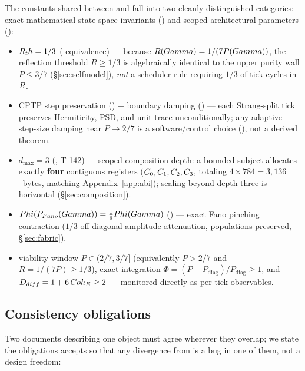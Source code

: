 The constants shared between \SYNARC{} and \TALOS{} fall into two cleanly
distinguished categories: exact mathematical state-space invariants ()
and scoped architectural parameters ():

\begin{itemize}[leftmargin=1.5em,itemsep=1pt]
  \item $R_th=1/3$ ( equivalence) --- because $R(Gamma)=1/(7P(Gamma))$,
        the reflection threshold $R\ge 1/3$ is algebraically identical to the
        upper purity wall $P\le 3/7$ (\S\ref{sec:selfmodel}), \emph{not} a
        scheduler rule requiring $1/3$ of tick cycles in $R$.
  \item CPTP step preservation () + boundary damping () ---
        each Strang-split tick preserves Hermiticity, PSD, and unit trace
        unconditionally; any adaptive step-size damping near $P\to 2/7$ is a
        software/control choice (), not a derived theorem.
  \item $d_{\max}=3$ (, T-142) --- scoped composition depth: a
        bounded subject allocates exactly \textbf{four} contiguous \DM{}
        registers ($C_0,C_1,C_2,C_3$, totaling $4\times 784 =
        3{,}136$~bytes, matching Appendix~\ref{app:abi}); scaling beyond depth
        three is horizontal (\S\ref{sec:composition}).
  \item $Phi(P_{Fano}(Gamma))=\tfrac{1}{9}Phi(Gamma)$
        () --- exact Fano pinching contraction ($1/3$ off-diagonal
        amplitude attenuation, populations preserved, \S\ref{sec:fabric}).
  \item viability window $P\in(2/7,3/7]$ (equivalently $P>2/7$ and
        $R=1/(7P)\ge 1/3$), exact integration
        $\Phi=(P-P_{\mathrm{diag}})/P_{\mathrm{diag}}\ge 1$, and
        $D_{diff}=1+6\,Coh_E\ge 2$ --- monitored directly as per-tick
        observables.
\end{itemize}

\subsection{Consistency obligations}

Two documents describing one object must agree wherever they overlap; we
state the obligations \TALOS{} accepts so that any divergence from \SYNARC{}
is a bug in one of them, not a design freedom:

